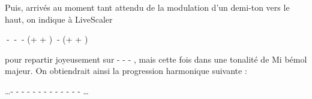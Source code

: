 Puis, arrivés au moment tant attendu de la modulation d'un demi-ton vers le haut, on indique à LiveScaler

\begin{center}
  \LSI $~$-  \LSIV $~$-  \LSV $~$-  (\LSpp + \LSMm +  \LSvi) $~$-  (\LSMod + \LSpp + \LSI)
\end{center}

\noindent pour repartir joyeusement sur \LSI - \LSIV - \LSV - \LSIV, mais cette fois dans une tonalité de Mi bémol majeur. On obtiendrait ainsi la progression harmonique suivante : 

\begin{center}
  \dots \hspace{4pt}-  -  -  -  -  -  -  -  -  -   -  -  - \dots
\end{center}


